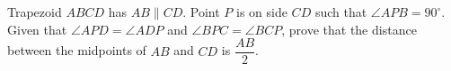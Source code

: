 Trapezoid $ABCD$ has $AB\parallel CD$. Point $P$ is on side $CD$ such that $\angle APB=90^\circ$. Given that $\angle APD=\angle ADP$ and $\angle BPC=\angle BCP$, prove that the distance between the midpoints of $AB$ and $CD$ is $\dfrac{AB}{2}$.
